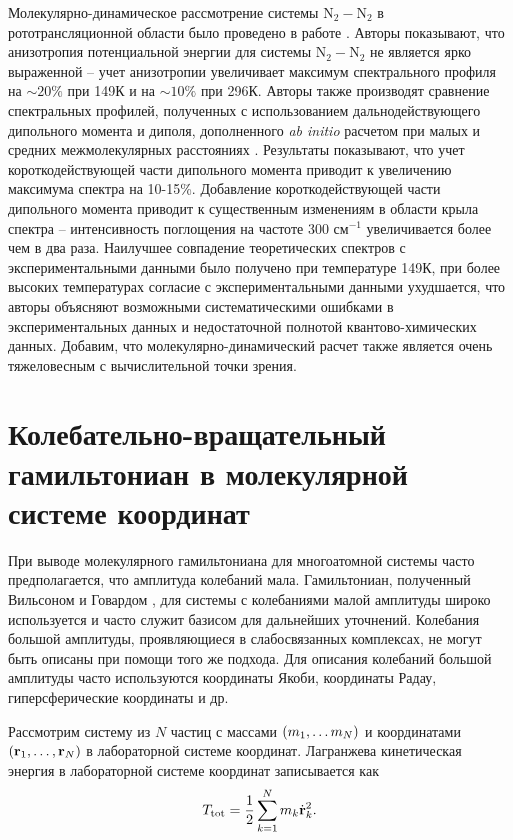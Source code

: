 Молекулярно-динамическое рассмотрение системы N$_2-$N$_2$ в рототрансляционной области было проведено в работе \cite{bussery2014}. Авторы показывают, что анизотропия потенциальной энергии для системы N$_2-$N$_2$ не является ярко выраженной -- учет анизотропии увеличивает максимум спектрального профиля на $\sim 20\%$ при 149К и на $\sim 10\%$ при 296К. Авторы также производят сравнение спектральных профилей, полученных с использованием дальнодействующего дипольного момента и диполя, дополненного \textit{ab initio} расчетом при малых и средних межмолекулярных расстояниях \cite{lokshtanov2008}. Результаты показывают, что учет короткодействующей части дипольного момента приводит к увеличению максимума спектра на 10-15\%. Добавление короткодействующей части дипольного момента приводит к существенным изменениям в области крыла спектра -- интенсивность поглощения на частоте 300 см$^{-1}$ увеличивается более чем в два раза. Наилучшее совпадение теоретических спектров с экспериментальными данными было получено при температуре 149К, при более высоких температурах согласие с экспериментальными данными ухудшается, что авторы объясняют возможными систематическими ошибками в экспериментальных данных и недостаточной полнотой квантово-химических данных. Добавим, что молекулярно-динамический расчет также является очень тяжеловесным с вычислительной точки зрения.

\section{Колебательно-вращательный гамильтониан в молекулярной системе координат}

При выводе молекулярного гамильтониана для многоатомной системы часто предполагается, что амплитуда колебаний мала. Гамильтониан, полученный Вильсоном и Говардом \cite{wilson1936}, для системы с колебаниями малой амплитуды широко используется и часто служит базисом для дальнейших уточнений. Колебания большой амплитуды, проявляющиеся в слабосвязанных комплексах, не могут быть описаны при помощи того же подхода. Для описания колебаний большой амплитуды часто используются координаты Якоби, координаты Радау, гиперсферические координаты и др. \par 
Рассмотрим систему из $N$ частиц с массами $\left( m_1, \dots m_N \right)$ и координатами $\left( \mathbf{r}_1, \dots, \mathbf{r}_N \right)$ в лабораторной системе координат. Лагранжева кинетическая энергия в лабораторной системе координат записывается как
\begin{gather}
    T_\text{tot} = \frac{1}{2} \sum_{k = 1}^N m_k \dot{\mathbf{r}}_k^2.
\end{gather}

